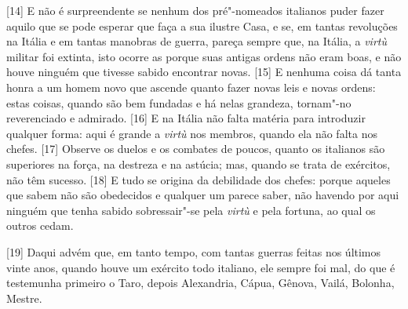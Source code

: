 {[}14{]} E não é surpreendente se nenhum dos pré"-nomeados italianos
puder fazer aquilo que se pode esperar que faça a sua ilustre Casa, e
se, em tantas revoluções na Itália e em tantas manobras de guerra,
pareça sempre que, na Itália, a \emph{virtù} militar foi extinta, isto
ocorre as porque suas antigas ordens não eram boas, e não houve ninguém
que tivesse sabido encontrar novas. {[}15{]} E nenhuma coisa dá tanta
honra a um homem novo que ascende quanto fazer
novas leis e novas ordens: estas coisas, quando são bem fundadas e há
nelas grandeza, tornam"-no reverenciado e admirado. {[}16{]} E na Itália
não falta matéria para introduzir qualquer forma: aqui é grande a
\emph{virtù} nos membros, quando ela não falta nos chefes. {[}17{]}
Observe os duelos e os combates de poucos, quanto os italianos são
superiores na força, na destreza e na astúcia; mas, quando se trata de
exércitos, não têm sucesso. {[}18{]} E tudo se origina da debilidade dos
chefes: porque aqueles que sabem não são obedecidos e qualquer um parece
saber, não havendo por aqui ninguém que tenha sabido sobressair"-se pela
\emph{virtù} e pela fortuna, ao qual os outros cedam.

{[}19{]} Daqui advém que, em tanto tempo, com tantas guerras feitas nos
últimos vinte anos, quando houve um exército todo italiano, ele sempre
foi mal, do que é testemunha primeiro o Taro, depois Alexandria,
Cápua,
Gênova, Vailá,
Bolonha,
Mestre.

